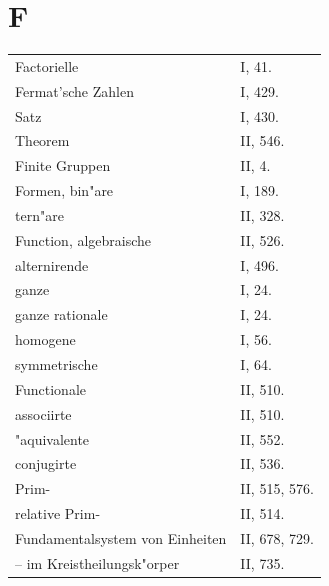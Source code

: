 \documentclass[10pt,a4paper]{article}
\theoremstyle{weberstyle}
\begin{document}
\section*{F}
\begin{flushleft}
\begin{tabular}{@{}p{8cm}l@{}}
Factorielle & I, 41.\\[4pt]
Fermat'sche Zahlen & I, 429.\\
\quad Satz & I, 430.\\
\quad Theorem & II, 546.\\[4pt]
Finite Gruppen & II, 4.\\[4pt]
Formen, bin"are & I, 189.\\
\quad tern"are & II, 328.\\[4pt]
Function, algebraische & II, 526.\\
\quad alternirende & I, 496.\\
\quad ganze & I, 24.\\
\quad ganze rationale & I, 24.\\
\quad homogene & I, 56.\\
\quad symmetrische & I, 64.\\[4pt]
Functionale & II, 510.\\
\quad associirte & II, 510.\\
\quad "aquivalente & II, 552.\\
\quad conjugirte & II, 536.\\
\quad Prim- & II, 515, 576.\\
\quad relative Prim- & II, 514.\\[4pt]
Fundamentalsystem von Einheiten & II, 678, 729.\\
\quad -- \quad im Kreistheilungsk"orper & II, 735.
\end{tabular}
\end{flushleft}
\end{document}
